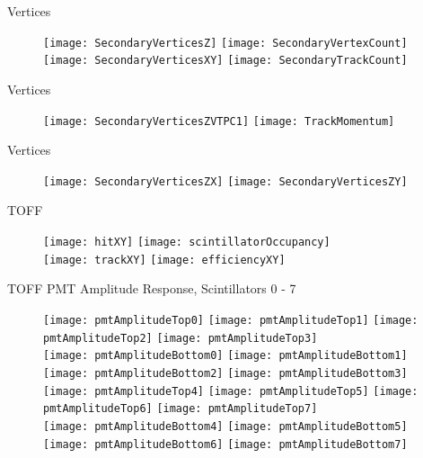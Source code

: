 \documentclass[11pt]{beamer}
\begin{document}
\begin{frame}{Vertices}
\begin{figure}
\centering
\texttt{[image: SecondaryVerticesZ]}
\texttt{[image: SecondaryVertexCount]} \\
\texttt{[image: SecondaryVerticesXY]}
\texttt{[image: SecondaryTrackCount]} \\
\end{figure}
\end{frame}

\begin{frame}{Vertices}
\begin{figure}
\centering
\texttt{[image: SecondaryVerticesZVTPC1]}
\texttt{[image: TrackMomentum]}
\end{figure}
\end{frame}

\begin{frame}{Vertices}
\begin{figure}
\centering
\texttt{[image: SecondaryVerticesZX]}
\texttt{[image: SecondaryVerticesZY]}
\end{figure}
\end{frame}

\begin{frame}{TOFF}
\begin{figure}
\centering
\texttt{[image: hitXY]}
\texttt{[image: scintillatorOccupancy]} \\
\texttt{[image: trackXY]}
\texttt{[image: efficiencyXY]}
\end{figure}
\end{frame}

\begin{frame}{TOFF PMT Amplitude Response, Scintillators 0 - 7}
\begin{figure}
\centering
\texttt{[image: pmtAmplitudeTop0]}
\texttt{[image: pmtAmplitudeTop1]}
\texttt{[image: pmtAmplitudeTop2]}
\texttt{[image: pmtAmplitudeTop3]} \\ 
\texttt{[image: pmtAmplitudeBottom0]}
\texttt{[image: pmtAmplitudeBottom1]}
\texttt{[image: pmtAmplitudeBottom2]}
\texttt{[image: pmtAmplitudeBottom3]} \\
\texttt{[image: pmtAmplitudeTop4]}
\texttt{[image: pmtAmplitudeTop5]}
\texttt{[image: pmtAmplitudeTop6]}
\texttt{[image: pmtAmplitudeTop7]} \\
\texttt{[image: pmtAmplitudeBottom4]}
\texttt{[image: pmtAmplitudeBottom5]}
\texttt{[image: pmtAmplitudeBottom6]}
\texttt{[image: pmtAmplitudeBottom7]} \\
\end{figure}
\end{frame}
\end{document}
